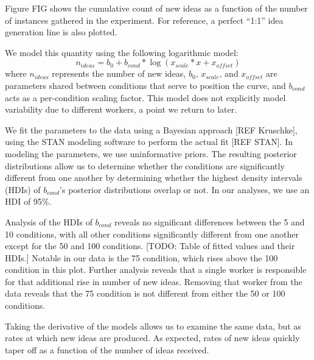 Figure FIG shows the cumulative count of new ideas as a function of the number of instances gathered in the experiment. For reference, a perfect ``1:1'' idea generation line is also plotted.

We model this quantity using the following logarithmic model:
\[n_{ideas} = b_0 + b_{cond} * \log (x_{scale} * x + x_{offset})\]
where $n_{ideas}$ represents the number of new ideas, $b_0$, $x_{scale}$, and $x_{offset}$ are parameters shared between conditions that serve to position the curve, and $b_{cond}$ acts as a per-condition scaling factor. This model does not explicitly model variability due to different workers, a point we return to later.

We fit the parameters to the data using a Bayesian approach [REF Kruschke], using the STAN modeling software to perform the actual fit [REF STAN]. In modeling the parameters, we use uninformative priors. The resulting posterior distributions allow us to determine whether the conditions are significantly different from one another by determining whether the highest density intervals (HDIs) of $b_{cond}$'s posterior distributions overlap or not. In our analyses, we use an HDI of 95\%.

Analysis of the HDIs of $b_{cond}$ reveals no significant differences between the 5 and 10 conditions, with all other conditions significantly different from one another except for the 50 and 100 conditions. [TODO: Table of fitted values and their HDIs.] Notable in our data is the 75 condition, which rises above the 100 condition in this plot. Further analysis reveals that a single worker is responsible for that additional rise in number of new ideas. Removing that worker from the data reveals that the 75 condition is not different from either the 50 or 100 conditions.

Taking the derivative of the models allows us to examine the same data, but as rates at which new ideas are produced. As expected, rates of new ideas quickly taper off as a function of the number of ideas received.

